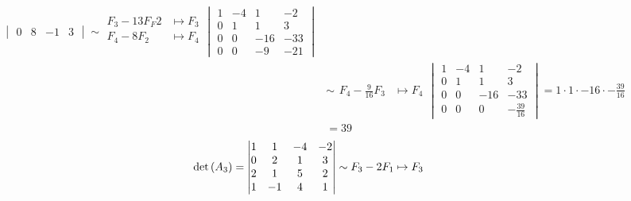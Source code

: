 \begin{enumerate}[label=\listAlph]
\[\begin{aligned}
\begin{vmatrix}
                        0 & 8 & -1 & 3
                    \end{vmatrix}
                    \sim
                    \begin{aligned}
                        F_3 - 13F_F2 &\mapsto F_3 \\
                        F_4 - 8F_2 &\mapsto F_4 \\
                    \end{aligned}
                    \begin{vmatrix}
                        1 & -4 & 1 & -2 \\
                        0 & 1 & 1 & 3 \\
                        0 & 0 & -16 & -33 \\
                        0 & 0 & -9 & -21
                    \end{vmatrix}
                    \\
                    &\sim
                    \begin{aligned}
                        F_4 - \frac{9}{16}F_3 &\mapsto F_4
                    \end{aligned}
                    \begin{vmatrix}
                        1 & -4 & 1 & -2 \\
                        0 & 1 & 1 & 3 \\
                        0 & 0 & -16 & -33 \\
                        0 & 0 & 0 & -\frac{39}{16}
                    \end{vmatrix}
                    =
                    1 \cdot 1 \cdot -16 \cdot -\frac{39}{16}
                    \\
                    &= 39
                \end{aligned}
            \]
            \[
                \begin{aligned}
                    \pdet{A_3} 
                    &=
                    \begin{vmatrix}
                        1 & 1 & -4 & -2 \\
                        0 & 2 & 1 & 3 \\
                        2 & 1 & 5 & 2 \\
                        1 & -1 & 4 & 1
                    \end{vmatrix}
                    \sim
                    \begin{aligned}
                        F_3 - 2F_1 &\mapsto F_3 \\

\end{aligned}
\end{aligned}\]
\end{enumerate}
